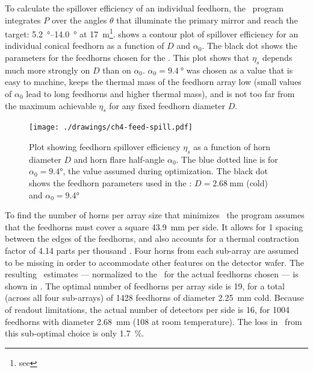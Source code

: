 To calculate the spillover efficiency of an individual feedhorn, the \MATLAB\ program integrates $P$ over the angles $\theta$ that illuminate the primary mirror and reach the target: \SIrange{5.2}{14.0}{\degree} at \SI{17}{\m}\footnote{see }.
 shows a contour plot of spillover efficiency for an individual conical feedhorn as a function of $D$ and $\alpha_0$.
The black dot shows the parameters for the feedhorns chosen for the \Imager.
This plot shows that $\eta_s$ depends much more strongly on $D$ than on $\alpha_0$.
$\alpha_0 = \SI{9.4}{\degree}$ was chosen as a value that is easy to machine, keeps the thermal mass of the feedhorn array low (small values of $\alpha_0$ lead to long feedhorns and higher thermal mass), and is not too far from the maximum achievable $\eta_s$ for any fixed feedhorn diameter $D$.

\begin{figure}
\centering
\texttt{[image: ./drawings/ch4-feed-spill.pdf]}
\caption[Feedhorn spillover efficiency]{
  Plot showing feedhorn spillover efficiency $\eta_s$ as a function of horn diameter $D$ and horn flare half-angle $\alpha_0$.
  The blue dotted line is for $\alpha_0 = \ang{9.4}$, the value assumed during optimization.
  The black dot shows the feedhorn parameters used in the \Imager: $D = \SI{2.68}{\mm}$ (cold) and $\alpha_0 = \ang{9.4}$
}
\label{fig:ch4-feed-spill}
\end{figure}

To find the number of horns per array size that minimizes \NETD\, the program assumes that the feedhorns must cover a square \SI{43.9}{\mm} per side.
It allows for \SI{1}{\mil} spacing between the edges of the feedhorns, and also accounts for a thermal contraction factor of 4.14 parts per thousand \cite[Appendix~A6.4]{ekin_experimental_2006}.
Four horns from each sub-array are assumed to be missing in order to accommodate other features on the detector wafer.
The resulting \NETD\ estimates --- normalized to the \NETD\ for the actual feedhorns chosen --- is shown in .
The optimal number of feedhorns per array side is 19, for a total (across all four sub-arrays) of 1428 feedhorns of diameter \SI{2.25}{\mm} cold.
Because of readout limitations, the actual number of detectors per side is 16, for 1004 feedhorns with diameter \SI{2.68}{\mm} (\SI{108}{\mils} at room temperature).
The loss in \NETD\ from this sub-optimal choice is only \SI{1.7}{\percent}.

